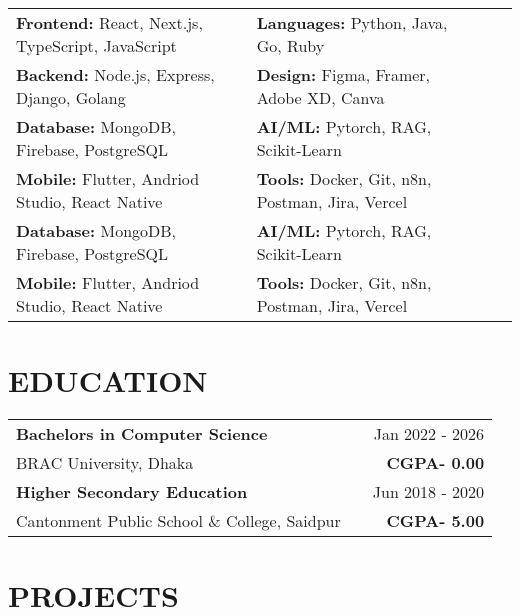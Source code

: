 \documentclass[a4paper,12pt]{article}
\begin{document}
\begin{tabular}{l l l l}
\textbf{Frontend:}  React, Next.js, TypeScript, JavaScript &\textbf{Languages:}  Python, Java, Go, Ruby \\
\textbf{Backend:}  Node.js, Express, Django, Golang & \textbf{Design:}  Figma, Framer, Adobe XD, Canva \\
\textbf{Database:}  MongoDB, Firebase, PostgreSQL & \textbf{AI/ML:} Pytorch, RAG, Scikit-Learn \\
\textbf{Mobile:}  Flutter, Andriod Studio, React Native & \textbf{Tools:}  Docker, Git, n8n, Postman, Jira, Vercel \\
\textbf{Database:}  MongoDB, Firebase, PostgreSQL & \textbf{AI/ML:} Pytorch, RAG, Scikit-Learn \\
\textbf{Mobile:}  Flutter, Andriod Studio, React Native & \textbf{Tools:}  Docker, Git, n8n, Postman, Jira, Vercel \\
\end{tabular}







\section{EDUCATION}
\begin{tabularx}{\linewidth}{@{}l X r@{}}
\textbf{Bachelors in Computer Science} & \hfill & Jan 2022 - 2026 \\
BRAC University, Dhaka & \hfill & \textbf{CGPA- 0.00} \\[15pt] 
\textbf{Higher Secondary Education} & \hfill & Jun 2018 - 2020 \\
Cantonment Public School \& College, Saidpur & \hfill & \textbf{CGPA- 5.00} \\
\end{tabularx}










  
\section{PROJECTS}
\end{document}
